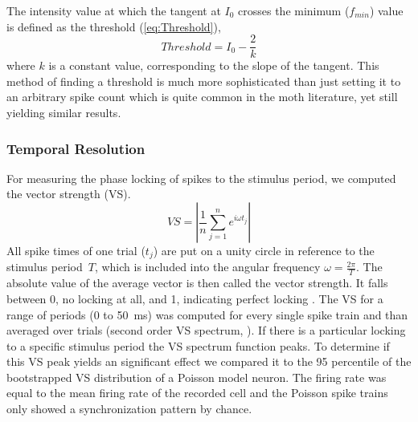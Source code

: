 \documentclass[12pt,a4paper,pdftex]{article}
\begin{document}
The intensity value at which the tangent at $I_{0}$ crosses the minimum ($f_{min}$) value is defined as the threshold (\ref{eq:Threshold}),  
\begin{equation}
\label{eq:Threshold}
Threshold = I_{0} - \frac{2}{k}
\end{equation}
where $k$ is a constant value, corresponding to the slope of the tangent.
This method of finding a threshold is much more sophisticated than just setting it to an arbitrary spike count which is quite common in the moth literature, yet still yielding similar results.


\subsubsection*{Temporal Resolution}
For measuring the phase locking of spikes to the stimulus period, we computed the vector strength (VS). 
\begin{equation}
\label{eq:VS}
VS = \left|\frac{1}{n} \sum_{j=1}^{n}e^{i\omega t_j}\right|
\end{equation}
All spike times of one trial ($t_{j}$) are put on a unity circle in reference to the stimulus period~$T$, which is included into the angular frequency $\omega = \frac{2\pi}{T}$. The absolute value of the average vector is then called the vector strength. It falls between 0, no locking at all, and 1, indicating perfect locking \cite{vanhemmen2013}. 
The VS for a range of periods (0 to 50~ms) was computed for every single spike train and than averaged over trials (second order VS spectrum, \cite{sinz2017a}). 
If there is a particular locking to a specific stimulus period the VS spectrum function peaks. To determine if this VS peak yields an significant effect we compared it to the 95 percentile of the bootstrapped VS distribution of a Poisson model neuron. The firing rate was equal to the mean firing rate of the recorded cell and the Poisson spike trains only showed a synchronization pattern by chance. 
\end{document}
